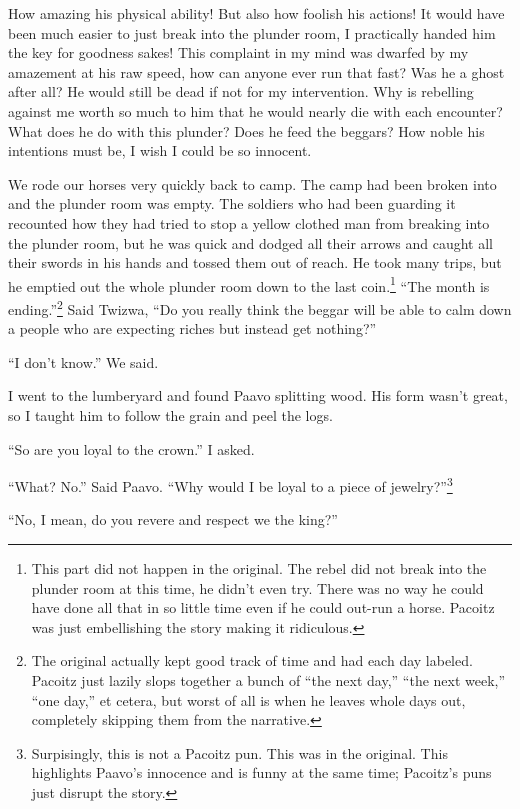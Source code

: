 How amazing his physical ability! But also how foolish his actions! It would have been much easier to just break into the plunder room, I practically handed him the key for goodness sakes! This complaint in my mind was dwarfed by my amazement at his raw speed, how can anyone ever run that fast? Was he a ghost after all? He would still be dead if not for my intervention. Why is rebelling against me worth so much to him that he would nearly die with each encounter? What does he do with this plunder? Does he feed the beggars? How noble his intentions must be, I wish I could be so innocent.

We rode our horses very quickly back to camp. The camp had been broken into and the plunder room was empty. The soldiers who had been guarding it recounted how they had tried to stop a yellow clothed man from breaking into the plunder room, but he was quick and dodged all their arrows and caught all their swords in his hands and tossed them out of reach. He took many trips, but he emptied out the whole plunder room down to the last coin.\footnote{This part did not happen in the original. The rebel did not break into the plunder room at this time, he didn't even try. There was no way he could have done all that in so little time even if he could out-run a horse. Pa\-co\-itz was just embellishing the story making it ridiculous.} 
``The month is ending.''\footnote{The original actually kept good track of time and had each day labeled. Pa\-co\-itz just lazily slops together a bunch of ``the next day,'' ``the next week,'' ``one day,'' et cetera, but worst of all is when he leaves whole days out, completely skipping them from the narrative.} Said Twi\-zwa, ``Do you really think the beggar will be able to calm down a people who are expecting riches but instead get nothing?''

``I don't know.'' We said.

\tbreak

I went to the lumberyard and found Paa\-vo splitting wood. His form wasn't great, so I taught him to follow the grain and peel the logs.

``So are you loyal to the crown.'' I asked.

``What? No.'' Said Paa\-vo. ``Why would I be loyal to a piece of jewelry?''\footnote{Surpisingly, this is not a Pa\-co\-itz pun. This was in the original. This highlights Paa\-vo's innocence and is funny at the same time; Pa\-co\-itz's puns just disrupt the story.}

``No, I mean, do you revere and respect we the king?''

